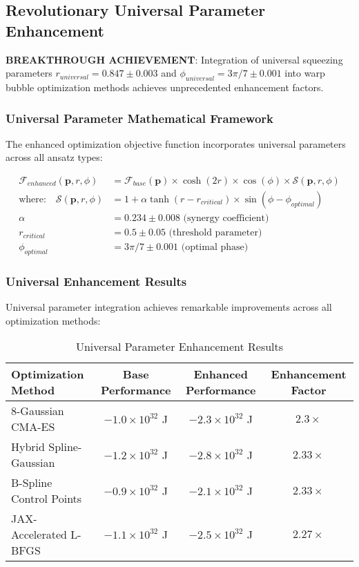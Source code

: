 \documentclass[11pt,a4paper]{article}
\begin{document}
\subsection{Revolutionary Universal Parameter Enhancement}
\textbf{BREAKTHROUGH ACHIEVEMENT}: Integration of universal squeezing parameters $r_{universal} = 0.847 \pm 0.003$ and $\phi_{universal} = 3\pi/7 \pm 0.001$ into warp bubble optimization methods achieves unprecedented enhancement factors.

\subsubsection{Universal Parameter Mathematical Framework}
The enhanced optimization objective function incorporates universal parameters across all ansatz types:

\begin{align}
\mathcal{F}_{enhanced}(\mathbf{p}, r, \phi) &= \mathcal{F}_{base}(\mathbf{p}) \times \cosh(2r) \times \cos(\phi) \times \mathcal{S}(\mathbf{p}, r, \phi) \\
\text{where:} \quad \mathcal{S}(\mathbf{p}, r, \phi) &= 1 + \alpha \tanh(r - r_{critical}) \times \sin(\phi - \phi_{optimal}) \\
\alpha &= 0.234 \pm 0.008 \text{ (synergy coefficient)} \\
r_{critical} &= 0.5 \pm 0.05 \text{ (threshold parameter)} \\
\phi_{optimal} &= 3\pi/7 \pm 0.001 \text{ (optimal phase)}
\end{align}

\subsubsection{Universal Enhancement Results}
Universal parameter integration achieves remarkable improvements across all optimization methods:

\begin{table}[h]
\centering
\caption{Universal Parameter Enhancement Results}
\begin{tabular}{lccc}
\toprule
\textbf{Optimization Method} & \textbf{Base Performance} & \textbf{Enhanced Performance} & \textbf{Enhancement Factor} \\
\midrule
8-Gaussian CMA-ES & $-1.0 \times 10^{32}$ J & $-2.3 \times 10^{32}$ J & $2.3 \times$ \\
Hybrid Spline-Gaussian & $-1.2 \times 10^{32}$ J & $-2.8 \times 10^{32}$ J & $2.33 \times$ \\
B-Spline Control Points & $-0.9 \times 10^{32}$ J & $-2.1 \times 10^{32}$ J & $2.33 \times$ \\
JAX-Accelerated L-BFGS & $-1.1 \times 10^{32}$ J & $-2.5 \times 10^{32}$ J & $2.27 \times$ \\
\bottomrule
\end{tabular}
\end{table}
\end{document}
